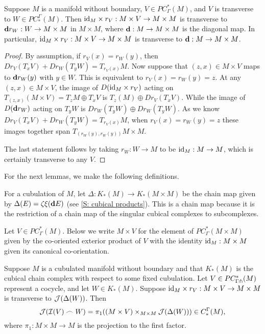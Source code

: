 \begin{lemma}\label{L: M times transverse diag}
Suppose $M$ is a manifold without boundary, $V\in PC^*_{\Gamma}(M)$, and $V$ is transverse to $W\in PC_*^\Gamma(M)$. Then $\mathrm{id}_M\times r_V:M\times V\to M\times M$ is transverse to $\mathbf{d} r_W:W\to M\times M$ in $M\times M$, where $\mathbf{d}:M\to M\times M$ is the diagonal map. In particular, $\mathrm{id}_M\times r_V:M\times V\to M\times M$ is transverse to $\mathbf{d}:M\to M\times M$.
\end{lemma}
\begin{proof}
By assumption, if $r_V(x)=r_W(y)$, then $Dr_V(T_xV)+Dr_W(T_yW)=T_{r_V(x)}M$. Now suppose that $(z,x)\in M\times V$ maps to $\mathbf{d} r_W(y)$ with $y\in W$. This is equivalent to $r_V(x)=r_W(y)=z$. At any $(z,x)\in M\times V$, the image of $D(\mathrm{id}_M\times r_V)$ acting on $T_{(z,x)}(M\times V)=T_zM\oplus T_xV$ is $T_z(M)\oplus Dr_V(T_xV)$. While the image of $D(\mathbf{d} r_W)$ acting on $T_yW$ is $Dr_W(T_yW)\oplus Dr_W(T_yW)$. As we know  $Dr_V(T_xV)+Dr_W(T_yW)=T_{r_V(x)}M$, when $r_V(x)=r_W(y)=z$ these images together span $T_{(r_W(y),r_W(y))}M\times M$.

The last statement follows by taking $r_W:W\to M$ to be $\mathrm{id}_M:M\to M$, which is certainly transverse to any $V$.
\end{proof}

For the next lemmas, we make the following definitions. 

\begin{definition}
For a cubulation of $M$, let $\Delta:K_*(M)\to K_*(M\times M)$ be the chain map given by $\Delta(E)=\zeta\xi(\mathbf{d} E)$ (see \cref{S: cubical products}). This is a chain map because it is the restriction of a chain map of the singular cubical complexes to subcomplexes.
\end{definition}

\begin{definition}
Let $V\in PC^*_\Gamma(M)$. Below we write $M\times V$ for the element of $PC^*_\Gamma(M\times M)$ given by the co-oriented exterior product of $V$ with the identity $\mathrm{id}_M:M\times M$ given its canonical co-orientation. 
\end{definition}


\begin{lemma}\label{L: image of cubical cap}
Suppose $M$ is a cubulated manifold without boundary and that $K_*(M)$ is the cubical chain complex with respect to some fixed cubulation.  Let $V\in PC^*_{\Gamma\pitchfork}(M)$ represent a cocycle, and let $W\in K_*(M)$. Suppose $\mathrm{id}_M\times r_V:M\times V\to M\times M$ is transverse to $\mathcal{J}(\Delta(W))$.  Then  $$\mathcal{J}(\mathcal{I}(V)\frown W)=\pi_1( (M\times V)\times_{M\times M}\mathcal{J}(\Delta(W)))\in C_*^\Gamma(M),$$
where $\pi_1:M\times M\to M$ is the projection to the first factor.
\end{lemma}

